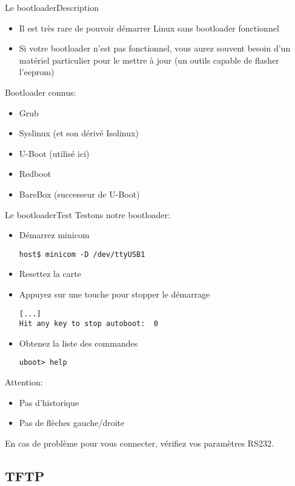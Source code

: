 \begin{frame}{Le bootloader}{Description}
  \begin{itemize}
    \item Il  est très  rare de pouvoir  démarrer Linux  sans bootloader
    fonctionnel
    \item Si votre bootloader  n'est pas fonctionnel, vous aurez souvent
    besoin d'un matériel particulier pour  le mettre à jour (un outils
    capable de flasher l'eeprom)
  \end{itemize}
  Bootloader connus:
  \begin{itemize}
    \item Grub
    \item Syslinux (et son dérivé Isolinux)
    \item U-Boot (utilisé ici)
    \item Redboot
    \item BareBox (successeur de U-Boot)
  \end{itemize}
\end{frame}

\begin{frame}[fragile=singleslide]{Le bootloader}{Test}
  Testons notre bootloader:
  \begin{itemize}
    \item Démarrez minicom
    \begin{lstlisting}
host$ minicom -D /dev/ttyUSB1
    \end{lstlisting}
  \item Resettez la carte
  \item Appuyez sur une touche pour stopper le démarrage
    \begin{lstlisting}
[...]
Hit any key to stop autoboot:  0
    \end{lstlisting}
  \item Obtenez la liste des commandes
    \begin{lstlisting}
uboot> help
    \end{lstlisting}
  \end{itemize}
  Attention:
  \begin{itemize}
  \item Pas d'historique
  \item Pas de flèches gauche/droite
  \end{itemize}
  En  cas de  problème pour  vous connecter,  vérifiez  vos paramètres
  RS232.
\end{frame}

\subsection{TFTP}

